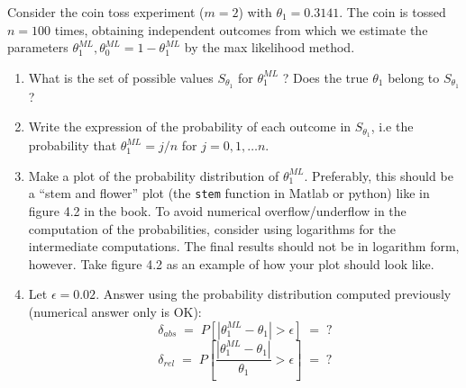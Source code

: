 \documentclass[10pt]{article}
\newcommand{\comment}[1]{}
\newcommand{\benum}{\begin{enumerate}}
\newcommand{\eenum}{\end{enumerate}}
\newcommand{\ML}{^{ML}}
\begin{document}
Consider the coin toss experiment ($m=2$) with $\theta_1=0.3141$. The
coin is tossed $n=100$ times, obtaining independent outcomes from
which we estimate the parameters
$\theta_1^{ML},\theta_0^{ML}=1-\theta_1\ML$ by the max likelihood
method.

\benum
\item  What is the set of possible values  $S_{\theta_1}$ for $\theta_1^{ML}$ ? Does the true $\theta_1$ belong to $S_{\theta_1}$?

\item 
 Write the expression of the probability of each outcome in
 $S_{\theta_1}$, i.e the probability that $\theta_1\ML=j/n$ for
 $j=0,1,\ldots n$.

\item \label{step:distribution}
Make a plot of the probability distribution of
$\theta_1\ML$. Preferably, this should be a ``stem and flower'' plot
(the {\tt stem} function in Matlab or python) like in figure 4.2 in the book. To
avoid numerical overflow/underflow in the computation of the
probabilities, consider using logarithms for the intermediate
computations. The final results should not be in logarithm form,
however. Take figure 4.2 as an example of how your plot should look
like.

\item 
Let $\epsilon=0.02$. Answer using the probability distribution
computed previously (numerical answer only is OK):
\[
\delta_{abs}\;=\;P[|\theta_1\ML-\theta_1|>\epsilon]\;=\;?
\]
\[
\delta_{rel}\;=\;P[\frac{|\theta_1\ML-\theta_1|}{\theta_1}>\epsilon]\;=\;?
\]
\comment{
\item \label{step:ml} Simulate tossing the coin with $\theta_1=0.3141$
$n=100$ times and compute $\theta_1\ML$. What is the value for
$\theta_1\ML$ you have obtained, and what are the absolute and relative
errors $|\theta_1\ML-\theta_1|,\,\frac{|\theta_1\ML
-\theta_1|}{\theta_1}$?}
\eenum
\end{document}
